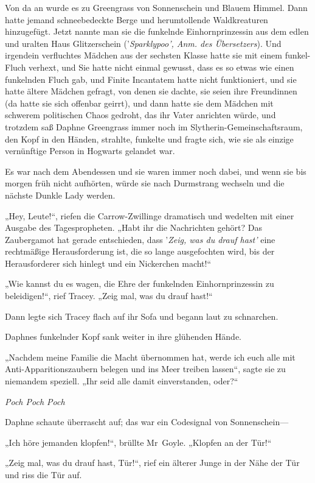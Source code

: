 {Von da an wurde es zu Greengrass von Sonnenschein und Blauem Himmel. Dann hatte jemand schneebedeckte Berge und herumtollende Waldkreaturen hinzugefügt. Jetzt nannte man sie die funkelnde Einhornprinzessin aus dem edlen und uralten Haus Glitzerschein ('\emph{Sparklypoo', Anm. des Übersetzers}). Und irgendein verfluchtes Mädchen aus der sechsten Klasse hatte sie mit einem funkel-Fluch verhext, und Sie hatte nicht einmal gewusst, dass es so etwas wie einen funkelnden Fluch gab, und Finite Incantatem hatte nicht funktioniert, und sie hatte ältere Mädchen gefragt, von denen sie dachte, sie seien ihre Freundinnen (da hatte sie sich offenbar geirrt), und dann hatte sie dem Mädchen mit schwerem politischen Chaos gedroht, das ihr Vater anrichten würde, und trotzdem saß Daphne Greengrass immer noch im Slytherin-Gemeinschaftsraum, den Kopf in den Händen, strahlte, funkelte und fragte sich, wie sie als einzige vernünftige Person in Hogwarts gelandet war.

Es war nach dem Abendessen und sie waren immer noch dabei, und wenn sie bis morgen früh nicht aufhörten, würde sie nach Durmstrang wechseln und die nächste Dunkle Lady werden.

„Hey, Leute!“, riefen die Carrow-Zwillinge dramatisch und wedelten mit einer Ausgabe des Tagespropheten. „Habt ihr die Nachrichten gehört? Das Zaubergamot hat gerade entschieden, dass '\emph{Zeig, was du drauf hast'} eine rechtmäßige Herausforderung ist, die so lange ausgefochten wird, bis der Herausforderer sich hinlegt und ein Nickerchen macht!“

„Wie kannst du es wagen, die Ehre der funkelnden Einhornprinzessin zu beleidigen!“, rief Tracey. „Zeig mal, was du drauf hast!“

Dann legte sich Tracey flach auf ihr Sofa und begann laut zu schnarchen.

Daphnes funkelnder Kopf sank weiter in ihre glühenden Hände.

„Nachdem meine Familie die Macht übernommen hat, werde ich euch alle mit Anti-Apparitionszaubern belegen und ins Meer treiben lassen“, sagte sie zu niemandem speziell. „Ihr seid alle damit einverstanden, oder?“

\emph{Poch Poch Poch}

Daphne schaute überrascht auf; das war ein Codesignal von Sonnenschein—

„Ich höre jemanden klopfen!“, brüllte Mr~Goyle. „Klopfen an der Tür!“

„Zeig mal, was du drauf hast, Tür!“, rief ein älterer Junge in der Nähe der Tür und riss die Tür auf.

}
